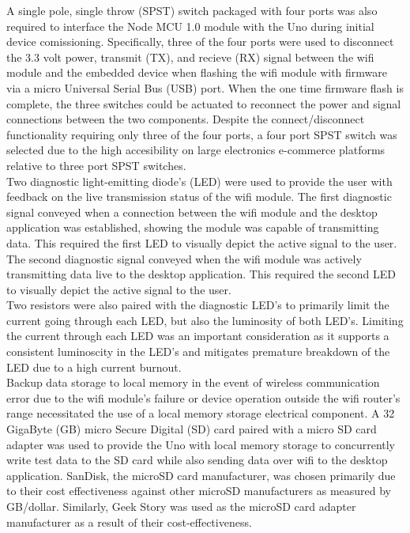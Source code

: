\documentclass[12pt, titlepage]{article}
\begin{document}
A single pole, single throw (SPST) switch packaged with four ports was also required to interface the Node MCU 1.0 module with the Uno during initial device comissioning. Specifically, three of the four ports were used to disconnect the 3.3 volt power, transmit (TX), and recieve (RX) signal between the wifi module and the embedded device when flashing the wifi module with firmware via a micro Universal Serial Bus (USB) port. When the one time firmware flash is complete, the three switches could be actuated to reconnect the power and signal connections between the two components. Despite the connect/disconnect functionality requiring only three of the four ports, a four port SPST switch was selected due to the high accesibility on large electronics e-commerce platforms relative to three port SPST switches. \\

Two diagnostic light-emitting diode's (LED) were used to provide the user with feedback on the live transmission status of the wifi module. The first diagnostic signal conveyed when a connection between the wifi module and the desktop application was established, showing the module was capable of transmitting data. This required the first LED to visually depict the active signal to the user. The second diagnostic signal conveyed when the wifi module was actively transmitting data live to the desktop application. This required the second LED to visually depict the active signal to the user. \\

Two resistors were also paired with the diagnostic LED's to primarily limit the current going through each LED, but also the luminosity of both LED's. Limiting the current through each LED was an important consideration as it supports a consistent luminoscity in the LED's and mitigates premature breakdown of the LED due to a high current burnout. \\

Backup data storage to local memory in the event of wireless communication error due to the wifi module's failure or device operation outside the wifi router's range necessitated the use of a local memory storage electrical component. A 32 GigaByte (GB) micro Secure Digital (SD) card paired with a micro SD card adapter was used to provide the Uno with local memory storage to concurrently write test data to the SD card while also sending data over wifi to the desktop application. SanDisk, the microSD card manufacturer, was chosen primarily due to their cost effectiveness against other microSD manufacturers as measured by GB/dollar. Similarly, Geek Story was used as the microSD card adapter manufacturer as a result of their cost-effectiveness. \\
\end{document}
